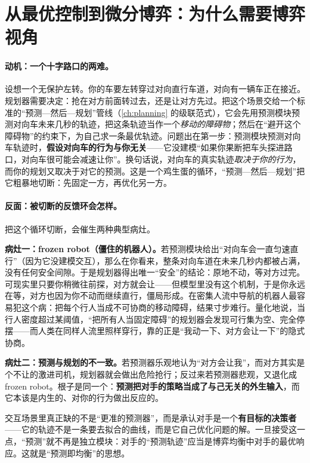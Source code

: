\section{从最优控制到微分博弈：为什么需要博弈视角}
\label{sec:dg-why}

\paragraph{动机：一个十字路口的两难。}
设想一个无保护左转。你的车要左转穿过对向直行车道，对向有一辆车正在接近。规划器需要决定：抢在对方前面转过去，还是让对方先过。把这个场景交给一个标准的“预测—然后—规划”管线（\cref{ch:planning} 的级联范式），它会先用预测模块预测对向车未来几秒的轨迹，把这条轨迹当作一个\emph{移动的障碍物}；然后在“避开这个障碍物”的约束下，为自己求一条最优轨迹。问题出在第一步：预测模块预测对向车轨迹时，\textbf{假设对向车的行为与你无关}——它没建模“如果你果断把车头探进路口，对向车很可能会减速让你”。换句话说，对向车的真实轨迹\emph{取决于你的行为}，而你的规划又取决于对它的预测。这是一个鸡生蛋的循环，“预测—然后—规划”把它粗暴地切断：先固定一方，再优化另一方。

\paragraph{反面：被切断的反馈环会怎样。}
把这个循环切断，会催生两种典型病灶。

\textbf{病灶一：frozen robot（僵住的机器人）。}\;若预测模块给出“对向车会一直匀速直行”（因为它没建模交互），那么在你看来，整条对向车道在未来几秒内都被占满，没有任何安全间隙。于是规划器得出唯一“安全”的结论：原地不动，等对方过完。可现实里只要你稍微往前探，对方就会让——但模型里没有这个机制，于是你永远在等，对方也因为你不动而继续直行，僵局形成。在密集人流中导航的机器人最容易犯这个病：把每个行人当成不可协商的移动障碍，结果寸步难行。量化地说，当行人密度超过某阈值，“把所有人当固定障碍”的规划器会发现可行集为空、完全停摆——而人类在同样人流里照样穿行，靠的正是“我动一下、对方会让一下”的隐式协商。

\textbf{病灶二：预测与规划的不一致。}\;若预测器乐观地认为“对方会让我”，而对方其实是个不让的激进司机，规划器就会做出危险抢行；反过来若预测器悲观，又退化成 frozen robot。根子是同一个：\textbf{预测把对手的策略当成了与己无关的外生输入}，而它本该是内生的、对你的行为做出反应的。

\begin{insight}
交互场景里真正缺的不是“更准的预测器”，而是承认对手是一个\textbf{有目标的决策者}——它的轨迹不是一条要去拟合的曲线，而是它自己优化问题的解。一旦接受这一点，“预测”就不再是独立模块：对手的“预测轨迹”应当是博弈均衡中对手的最优响应。这就是“预测即均衡”的思想。
\end{insight}


